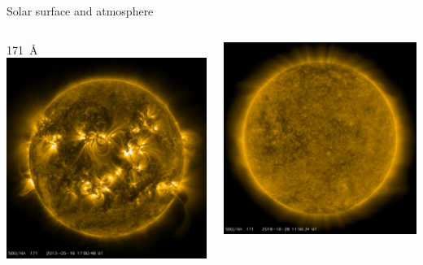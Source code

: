 \begin{frame}[plain,c]{Solar surface and atmosphere}{}
\begin{columns}[c]
	
		\centering \small \SI{171}{\AA} \color{white}{g}
		\includegraphics[width=\textwidth]{../talk_figures/20130516_170048_1024_0171.jpg}
		
		\includegraphics[width=\textwidth]{../talk_figures/20181028_115634_1024_0171.jpg}
		

\end{columns}
\end{frame}

